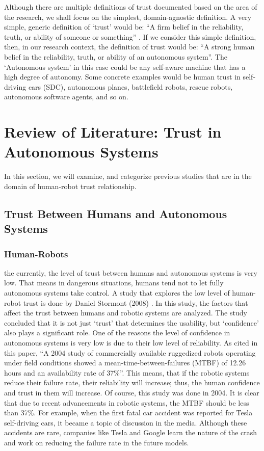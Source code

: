 \documentclass[runningheads,a4paper]{llncs}
\begin{document}
Although there are multiple definitions of trust documented based on the area of the research,  we shall focus on the simplest, domain-agnostic definition. A very simple, generic definition of `trust' would be: ``A firm belief in the reliability, truth, or ability of someone or something'' \cite{oxfordDicTrust}. If we consider this simple definition, then, in our research context, the definition of trust would be: ``A strong human belief in the reliability, truth, or ability of an autonomous system''. The `Autonomous system' in this case could be any self-aware machine that has a high degree of autonomy. Some concrete examples would be human trust in self-driving cars (SDC), autonomous planes, battlefield robots, rescue robots, autonomous software agents, and so on.

\section{Review of Literature: Trust in Autonomous Systems}
In this section, we will examine, and categorize previous studies that are in the domain of human-robot trust relationship.

\subsection{Trust Between Humans and Autonomous Systems}

\subsubsection{Human-Robots}
 the  currently, the level of trust between humans and autonomous systems is very low. That means in dangerous situations, humans tend not to let fully autonomous systems take control. A study that explores the low level of human-robot trust is done by Daniel Stormont (2008) \cite{stormont2008analyzing}. In this study, the factors that affect the trust between humans and robotic systems are analyzed. The study concluded that it is not just `trust' that determines the usability, but `confidence' also plays a significant role. One of the reasons the level of confidence in autonomous systems is very low is due to their low level of reliability. As cited in this paper, ``A 2004 study of commercially available ruggedized robots operating under
field conditions showed a mean-time-between-failures
(MTBF) of 12.26 hours and an availability rate of 37\%''\cite{carlson2004investigation}. This means, that if the robotic systems reduce their failure rate, their reliability will increase; thus, the human confidence and trust in them will increase. Of course, this study was done in 2004. It is clear that due to recent advancements in robotic systems, the MTBF should be less than 37\%. For example, when the first fatal car accident was reported for Tesla self-driving cars, it became a topic of discussion in the media. Although these accidents are rare, companies like Tesla and Google learn the nature of the crash and work on reducing the failure rate in the future models. \cite{TeslaFatalAccident}
\end{document}
